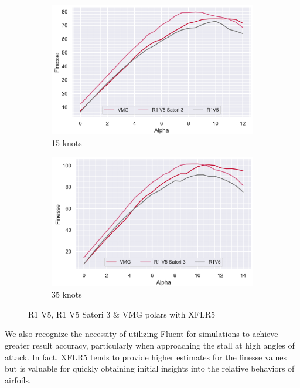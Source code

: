 \begin{figure}[H]
    \begin{subfigure}{0.5\textwidth}
    \includegraphics[width=1\textwidth]{figures/2D steady simulations/fluent/finesse VMG SAT3 R1V5 15kts XFLR5.png}
    \caption{15 knots}
    \label{fig:15 knots XFLR5}
    \end{subfigure}
    \begin{subfigure}{0.5\textwidth}
    \includegraphics[width=1\textwidth]{figures/2D steady simulations/fluent/finesse VMG SAT3 R1V5 35kts XFLR5.png}
    \caption{35 knots}
    \label{fig:35 knots XFLR5}
    \end{subfigure}
    \caption{R1 V5, R1 V5 Satori 3 \& VMG polars with XFLR5}
\label{fig:The R1 V5 meshing under XFLR5}
\end{figure}

We also recognize the necessity of utilizing Fluent for simulations to achieve greater result accuracy, particularly when approaching the stall at high angles of attack. In fact, XFLR5 tends to provide higher estimates for the finesse values but is valuable for quickly obtaining initial insights into the relative behaviors of airfoils.

